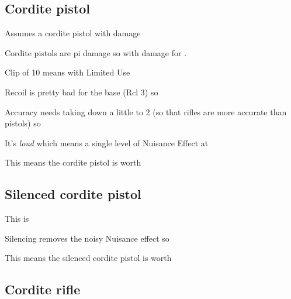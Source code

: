 \subsection{Cordite pistol}
\label{sec:cordite-pistol}

Assumes a cordite pistol with  damage

\begin{innateattack}
  \item Cordite pistols are pi damage so  with
     damage for .
  \item Clip of 10 means  with Limited Use
  \item Recoil is pretty bad for the base (Rcl 3) so
  \item Accuracy needs taking down a little to 2 (so that rifles are more
    accurate than pistols) so 
  \item It's \emph{loud} which means a single level of Nuisance Effect at
  \item This means the cordite pistol is worth \InnateAttackTotalPoints{}
\end{innateattack}

\InnateAttackBreakdown{}

\subsection{Silenced cordite pistol}
\label{sec:silenc-cord-pist}

\begin{innateattack}
  \item This is 
  \item Silencing removes the noisy Nuisance effect so
  \item This means the silenced cordite pistol is worth
    \InnateAttackTotalPoints{}
\end{innateattack}

\InnateAttackBreakdown{}

\subsection{Cordite rifle}
\label{sec:cordite-rifle}

